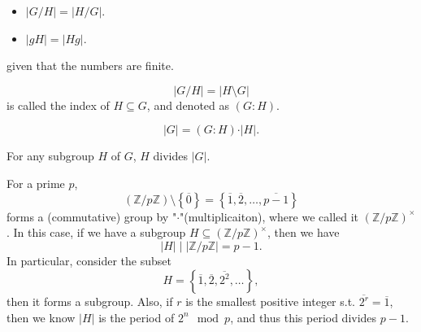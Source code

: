 \begin{theorem}
    \vphantom{text}
    \begin{itemize}
        \item \(\left\vert G / H \right\vert = \left\vert H / G \right\vert  \). 
        \item \(\left\vert gH \right\vert = \left\vert Hg \right\vert  \).  
    \end{itemize}
    given that the numbers are finite.
\end{theorem}

\begin{notation}
    \[
        \left\vert G / H \right\vert = \left\vert H \setminus G \right\vert  
    \] is called the index of \(H \subseteq G\), and denoted as \((G:H)\).   
\end{notation}

\begin{theorem}
    \[
        \vert G \vert = (G:H) \cdot \vert H \vert.
    \]
\end{theorem}

\begin{corollary} \label{cl: Lagrange theorem}
    For any subgroup \(H\) of \(G\), \(H\) divides \(\vert G \vert \).
\end{corollary}

\begin{eg}
    For a prime \(p\), 
    \[
        \left( \mathbb{Z} / p \mathbb{Z}  \right) \setminus \left\{ \overline{0} \right\} = \left\{ \overline{1}, \overline{2}, \dots , \overline{p-1}   \right\}   
    \]forms a (commutative) group by "\(\cdot\)"(multiplicaiton), where we called it \(\left( \mathbb{Z} / p \mathbb{Z}  \right)^{\times } \). In this case, if we have a subgroup \(H \subseteq (\mathbb{Z} / p \mathbb{Z} )^{\times }\), then we have
    \[
        \vert H \vert \mid \left\vert \mathbb{Z} / p \mathbb{Z}  \right\vert  = p - 1.  
    \] In particular, consider the subset
    \[
        H = \left\{ \overline{1}, \overline{2}, \overline{2^2}, \dots    \right\},
    \] then it forms a subgroup. Also, if \(r\) is the smallest positive integer s.t. \(\overline{2^r} = \overline{1} \), then we know \(\vert H \vert \) is the period of \(2^n \mod{p}\), and thus this period divides \(p - 1\). 
\end{eg}
